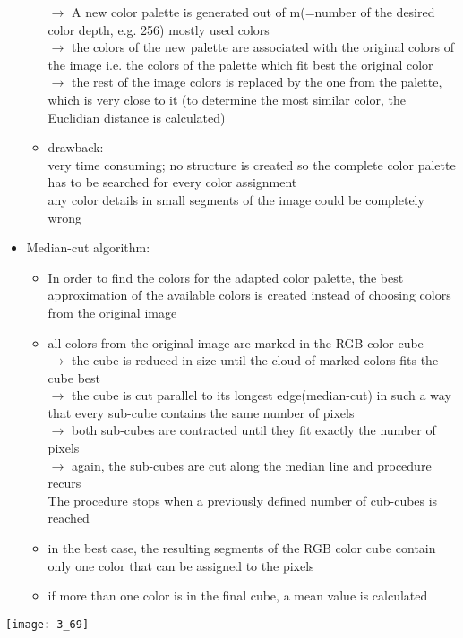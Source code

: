 \documentclass{standalone}
\begin{document}
\begin{itemize}
\begin{itemize}
		$\rightarrow$ A new color palette is generated out of m(=number of the desired color depth, e.g. 256) mostly used colors \\
		$\rightarrow$ the colors of the new palette are associated with the original colors of the image i.e. the colors of the palette which fit best the original color \\
		$\rightarrow$ the rest of the image colors is replaced by the one from the palette, which is very close to it (to determine the most similar color, the Euclidian distance is calculated)
		\item drawback:\\
		very time consuming; no structure is created so the complete color palette has to be searched for every color assignment \\
		any color details in small segments of the image could be completely wrong
	\end{itemize}
	\item Median-cut algorithm:
	\begin{itemize}
		\item In order to find the colors for the adapted color palette, the best approximation of the available colors is created instead of choosing colors from the original image
		\item all colors from the original image are marked in the RGB color cube \\
		$\rightarrow$ the cube is reduced in size until the cloud of marked colors fits the cube best \\
		$\rightarrow$ the cube is cut parallel to its longest edge(median-cut) in such a way that every sub-cube contains the same number of pixels \\
		$\rightarrow$  both sub-cubes are contracted until they fit exactly the number of pixels \\
		$\rightarrow$ again, the sub-cubes are cut along the median line and procedure recurs \\
		The procedure stops when a previously defined number of cub-cubes is reached
		\item in the best case, the resulting segments of the RGB color cube contain only one color that can be assigned to the pixels
		\item if more than one color is in the final cube, a mean value is calculated
	\end{itemize}
\end{itemize}

\texttt{[image: 3\_69]}
\end{document}
